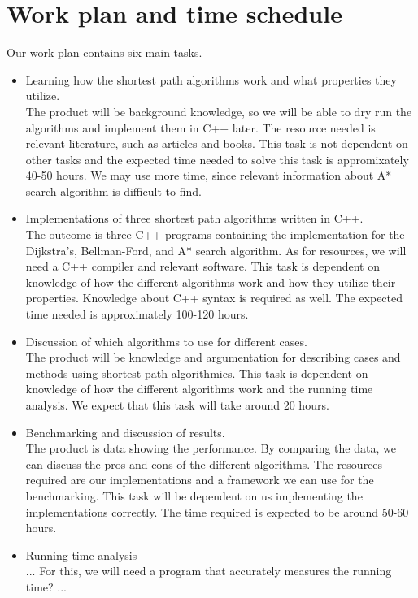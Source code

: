 \documentclass[11pt]{article}
\begin{document}
\section{Work plan and time schedule}
Our work plan contains six main tasks.
\begin{itemize}
\item Learning how the shortest path algorithms work and what properties they utilize.\\
The product will be background knowledge, so we will be able to dry run the algorithms and implement them in C++ later. The resource needed is relevant literature, such as articles and books. This task is not dependent on other tasks and the expected time needed to solve this task is appromixately 40-50 hours. We may use more time, since relevant information about A* search algorithm is difficult to find.

\item Implementations of three shortest path algorithms written in C++.\\
The outcome is three C++ programs containing the implementation for the Dijkstra's, Bellman-Ford, and A* search algorithm. As for resources, we will need a C++ compiler and relevant software. This task is dependent on knowledge of how the different algorithms work and how they utilize their properties. Knowledge about C++ syntax is required as well. The expected time needed is approximately 100-120 hours.

\item Discussion of which algorithms to use for different cases.\\
The product will be knowledge and argumentation for describing cases and methods using shortest path algorithmics. This task is dependent on knowledge of how the different algorithms work and the running time analysis. We expect that this task will take around 20 hours.

\item Benchmarking and discussion of results.\\
The product is data showing the performance. By comparing the data, we can discuss the pros and cons of the different algorithms. The resources required are our implementations and a framework we can use for the benchmarking. This task will be dependent on us implementing the implementations correctly. The time required is expected to be around 50-60 hours.

\item Running time analysis\\
...
For this, we will need a program that accurately measures the running time?
...


\end{itemize}
\end{document}
